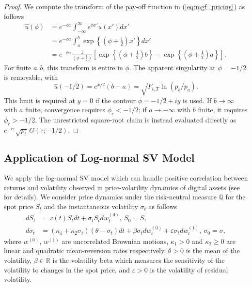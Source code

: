 \documentclass[pdftex,11pt,a4paper] {article}
\begin{document}
\begin{proof}
We compute the transform of the pay-off function in (\ref{eq:mgf_pricing}) as follows
\begin{equation} \label{eq:srp3}
\begin{split}
   \widehat{u}(\phi) & =  e^{-\phi x} \int^{\infty}_{-\infty} e^{\phi x'} u(x') dx'\\
	& = e^{-\phi x}\int^{b}_{a} \exp\left\{\left(\phi+\frac{1}{2}\right)x'\right\} dx'\\
		& = e^{-\phi x}\frac{1}{\left(\phi+\frac{1}{2}\right)} \left[\exp\left\{\left(\phi+\frac{1}{2}\right)b\right\} - \exp\left\{\left(\phi+\frac{1}{2}\right)a\right\} \right],
\end{split}
\end{equation}
For finite $a,b$, this transform is entire in $\phi$. The apparent singularity at $\phi=-1/2$ is removable, with
\begin{equation*}
\widehat u(-1/2)=e^{x/2}(b-a)=\sqrt{F_{t,T}}\ln(p_b/p_a).
\end{equation*}
This limit is required at $y=0$ if the contour $\phi=-1/2+iy$ is used. If $b\to\infty$ with $a$ finite, convergence requires $\phi_r<-1/2$; if $a\to-\infty$ with $b$ finite, it requires $\phi_r>-1/2$. The unrestricted square-root claim is instead evaluated directly as $e^{-r\tau}\sqrt{p_t}\,G(\tau;-1/2)$.

\end{proof}

\subsection{Application of Log-normal SV Model}

We apply the log-normal SV model which can handle positive correlation
between returns and volatility observed in price-volatility dynamics of
digital assets (see \citet{SeppRakhmonoV2023} for details). We consider
price dynamics under the risk-neutral measure $\mathbb{Q}$ for the spot
price $S_{t}$ and the instantaneous volatility $\sigma_{t}$ as follows
\begin{equation}  \label{eq:svmd1}
\begin{split}
dS_{t}&=r(t)S_{t}dt+\sigma_{t}S_{t}dw^{(0)}_{t}, \ S_{0} =S, \\
d\sigma_{t}& =\left(\kappa_{1} + \kappa_{2}\sigma_{t} \right)(\theta -
\sigma_{t})dt+ \beta \sigma_{t}dw^{(0)}_{t} + \varepsilon \sigma_{t}
dw^{(1)}_{t}, \ \sigma_{0}=\sigma,
\end{split}%
\end{equation}
where $w^{(0)}$, $w^{(1)}$ are uncorrelated Brownian motions, $\kappa_1>0$
and $\kappa_2 \geq 0$ are linear and quadratic mean-reversion rates
respectively, $\theta>0$ is the mean of the volatility, $\beta\in\mathbb{R}$
is the volatility beta which measures the sensitivity of the volatility to
changes in the spot price, and $\varepsilon>0$ is the volatility of residual
volatility.
\end{document}
